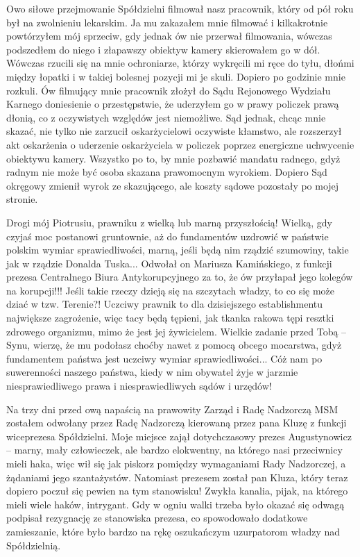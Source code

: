 Owo siłowe przejmowanie Spółdzielni filmował nasz pracownik, który od pół roku był na zwolnieniu lekarskim. Ja mu zakazałem mnie filmować i kilkakrotnie powtórzyłem mój sprzeciw, gdy jednak ów nie przerwał filmowania, wówczas podszedłem do niego i złapawszy obiektyw kamery skierowałem go w dół. Wówczas rzucili się na mnie ochroniarze, którzy wykręcili mi ręce do tyłu, dłońmi między łopatki i w takiej bolesnej pozycji mi je skuli. Dopiero po godzinie mnie rozkuli. Ów filmujący mnie pracownik złożył do Sądu Rejonowego Wydziału Karnego doniesienie o przestępstwie, że uderzyłem go w prawy policzek prawą dłonią, co z oczywistych względów jest niemożliwe. Sąd jednak, chcąc mnie skazać, nie tylko nie zarzucił oskarżycielowi oczywiste kłamstwo, ale rozszerzył akt oskarżenia o uderzenie oskarżyciela w policzek poprzez energiczne uchwycenie obiektywu kamery. Wszystko po to, by mnie pozbawić mandatu radnego, gdyż radnym nie może być osoba skazana prawomocnym wyrokiem. Dopiero Sąd okręgowy zmienił wyrok ze skazującego, ale koszty sądowe pozostały po mojej stronie.

Drogi mój Piotrusiu, prawniku z wielką lub marną przyszłością! Wielką, gdy czyjaś moc postanowi gruntownie, aż do fundamentów uzdrowić w państwie polskim wymiar sprawiedliwości, marną, jeśli będą nim rządzić szumowiny, takie jak w rządzie Donalda Tuska... Odwołał on Mariusza Kamińskiego, z funkcji prezesa Centralnego Biura Antykorupcyjnego za to, że ów przyłapał jego kolegów na korupcji!!! Jeśli takie rzeczy dzieją się na szczytach władzy, to co się może dziać w tzw. Terenie?! Uczciwy prawnik to dla dzisiejszego establishmentu największe zagrożenie, więc tacy będą tępieni, jak tkanka rakowa tępi resztki zdrowego organizmu, mimo że jest jej żywicielem. Wielkie zadanie przed Tobą – Synu, wierzę, że mu podołasz choćby nawet z pomocą obcego mocarstwa, gdyż fundamentem państwa jest uczciwy wymiar sprawiedliwości... Cóż nam po suwerenności naszego państwa, kiedy w nim obywatel żyje w jarzmie niesprawiedliwego prawa i niesprawiedliwych sądów i urzędów!

Na trzy dni przed ową napaścią na prawowity Zarząd i Radę Nadzorczą MSM zostałem odwołany przez Radę Nadzorczą kierowaną przez pana Kluzę z funkcji wiceprezesa Spółdzielni. Moje miejsce zajął dotychczasowy prezes Augustynowicz – marny, mały człowieczek, ale bardzo elokwentny, na którego nasi przeciwnicy mieli haka, więc wił się jak piskorz pomiędzy wymaganiami Rady Nadzorczej, a żądaniami jego szantażystów. Natomiast prezesem został pan Kluza, który teraz dopiero poczuł się pewien na tym stanowisku! Zwykła kanalia, pijak, na którego mieli wiele haków, intrygant. Gdy w ogniu walki trzeba było okazać się odwagą podpisał rezygnację ze stanowiska prezesa, co spowodowało dodatkowe zamieszanie, które było bardzo na rękę oszukańczym uzurpatorom władzy nad Spółdzielnią.

